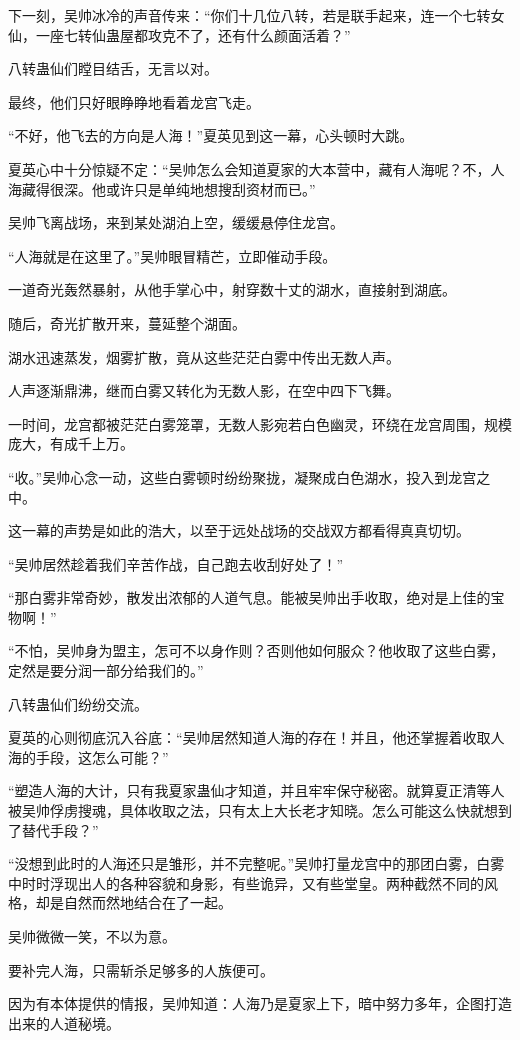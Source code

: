 \begin{this_body}
下一刻，吴帅冰冷的声音传来：“你们十几位八转，若是联手起来，连一个七转女仙，一座七转仙蛊屋都攻克不了，还有什么颜面活着？”

八转蛊仙们瞠目结舌，无言以对。

最终，他们只好眼睁睁地看着龙宫飞走。

“不好，他飞去的方向是人海！”夏英见到这一幕，心头顿时大跳。

夏英心中十分惊疑不定：“吴帅怎么会知道夏家的大本营中，藏有人海呢？不，人海藏得很深。他或许只是单纯地想搜刮资材而已。”

吴帅飞离战场，来到某处湖泊上空，缓缓悬停住龙宫。

“人海就是在这里了。”吴帅眼冒精芒，立即催动手段。

一道奇光轰然暴射，从他手掌心中，射穿数十丈的湖水，直接射到湖底。

随后，奇光扩散开来，蔓延整个湖面。

湖水迅速蒸发，烟雾扩散，竟从这些茫茫白雾中传出无数人声。

人声逐渐鼎沸，继而白雾又转化为无数人影，在空中四下飞舞。

一时间，龙宫都被茫茫白雾笼罩，无数人影宛若白色幽灵，环绕在龙宫周围，规模庞大，有成千上万。

“收。”吴帅心念一动，这些白雾顿时纷纷聚拢，凝聚成白色湖水，投入到龙宫之中。

这一幕的声势是如此的浩大，以至于远处战场的交战双方都看得真真切切。

“吴帅居然趁着我们辛苦作战，自己跑去收刮好处了！”

“那白雾非常奇妙，散发出浓郁的人道气息。能被吴帅出手收取，绝对是上佳的宝物啊！”

“不怕，吴帅身为盟主，怎可不以身作则？否则他如何服众？他收取了这些白雾，定然是要分润一部分给我们的。”

八转蛊仙们纷纷交流。

夏英的心则彻底沉入谷底：“吴帅居然知道人海的存在！并且，他还掌握着收取人海的手段，这怎么可能？”

“塑造人海的大计，只有我夏家蛊仙才知道，并且牢牢保守秘密。就算夏正清等人被吴帅俘虏搜魂，具体收取之法，只有太上大长老才知晓。怎么可能这么快就想到了替代手段？”

“没想到此时的人海还只是雏形，并不完整呢。”吴帅打量龙宫中的那团白雾，白雾中时时浮现出人的各种容貌和身影，有些诡异，又有些堂皇。两种截然不同的风格，却是自然而然地结合在了一起。

吴帅微微一笑，不以为意。

要补完人海，只需斩杀足够多的人族便可。

因为有本体提供的情报，吴帅知道：人海乃是夏家上下，暗中努力多年，企图打造出来的人道秘境。


\end{this_body}

